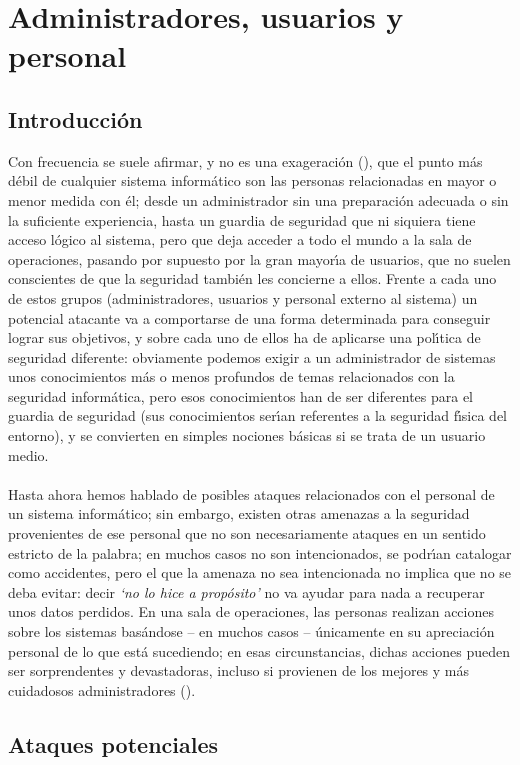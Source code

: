 \chapter{Administradores, usuarios y personal}
\section{Introducci\'on}
Con frecuencia se suele afirmar, y no es una exageraci\'on (\cite{kn:and94}), 
que el punto m\'as d\'ebil de cualquier sistema
inform\'atico son las personas relacionadas en mayor o menor medida con \'el;
desde un administrador sin una preparaci\'on adecuada o sin la suficiente 
experiencia, hasta un guardia de seguridad que ni siquiera tiene acceso 
l\'ogico al sistema, pero que deja acceder a todo el mundo a la sala de 
operaciones, pasando por supuesto por la gran mayor\'{\i}a de usuarios, que no 
suelen conscientes de que la seguridad tambi\'en les concierne a ellos. Frente 
a cada uno de estos grupos (administradores, usuarios y personal externo al 
sistema) un potencial atacante va a comportarse de una forma determinada para 
conseguir lograr sus objetivos, y sobre cada uno de ellos ha de aplicarse una 
pol\'{\i}tica de seguridad diferente: obviamente podemos exigir a un 
administrador de sistemas unos conocimientos m\'as o menos profundos de temas
relacionados con la seguridad inform\'atica, pero esos conocimientos han de ser
diferentes para el guardia de seguridad (sus conocimientos ser\'{\i}an 
referentes a la seguridad f\'{\i}sica del entorno), y se convierten en simples
nociones b\'asicas si se trata de un usuario medio.\\
\\Hasta ahora hemos hablado de posibles ataques relacionados con el personal de
un sistema inform\'atico; sin embargo, existen otras amenazas a la seguridad
provenientes de ese personal que no son necesariamente ataques en un sentido
estricto de la palabra; en muchos casos no son intencionados, se podr\'{\i}an
catalogar como accidentes, pero el que la amenaza no sea intencionada no implica
que no se deba evitar: decir {\it `no lo hice a prop\'osito'} no va ayudar para 
nada a recuperar unos datos perdidos. En una sala de operaciones, las
personas realizan acciones sobre los sistemas bas\'andose -- en muchos casos
-- \'unicamente en su apreciaci\'on personal de lo que est\'a sucediendo; en
esas circunstancias, dichas acciones pueden ser sorprendentes y devastadoras,
incluso si provienen de los mejores y m\'as cuidadosos administradores 
(\cite{kn:nrc99}).
\section{Ataques potenciales}
